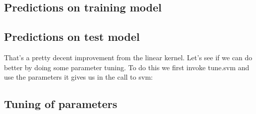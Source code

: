 \documentclass[]{book}
\newenvironment{Shaded}{\begin{snugshade}}{\end{snugshade}}
\newcommand{\CommentTok}[1]{\textcolor[rgb]{0.56,0.35,0.01}{\textit{#1}}}
\newcommand{\DataTypeTok}[1]{\textcolor[rgb]{0.13,0.29,0.53}{#1}}
\newcommand{\KeywordTok}[1]{\textcolor[rgb]{0.13,0.29,0.53}{\textbf{#1}}}
\newcommand{\NormalTok}[1]{#1}
\newcommand{\OperatorTok}[1]{\textcolor[rgb]{0.81,0.36,0.00}{\textbf{#1}}}
\newcommand{\StringTok}[1]{\textcolor[rgb]{0.31,0.60,0.02}{#1}}
\begin{document}
\hypertarget{predictions-on-training-model-5}{%
\subsection{Predictions on training model}\label{predictions-on-training-model-5}}

\begin{Shaded}
\end{Shaded}

\hypertarget{predictions-on-test-model-5}{%
\subsection{Predictions on test model}\label{predictions-on-test-model-5}}

\begin{Shaded}
\end{Shaded}

That's a pretty decent improvement from the linear kernel. Let's see if we can do better by doing some parameter tuning. To do this we first invoke tune.svm and use the parameters it gives us in the call to svm:

\hypertarget{tuning-of-parameters-1}{%
\subsection{Tuning of parameters}\label{tuning-of-parameters-1}}
\end{document}
